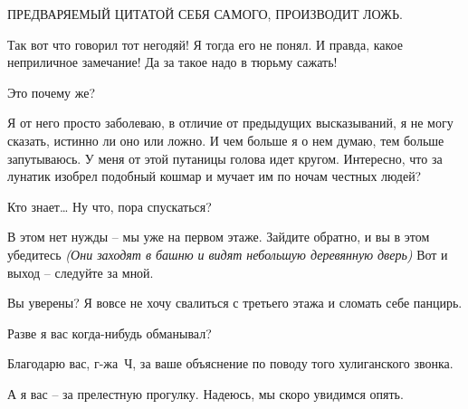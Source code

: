 \documentclass[../main.tex]{subfiles}
\begin{document}
\begin{Dialogue}
ПРЕДВАРЯЕМЫЙ ЦИТАТОЙ СЕБЯ САМОГО, ПРОИЗВОДИТ ЛОЖЬ.

Так вот что говорил тот негодяй! Я тогда его не понял. И правда, какое неприличное замечание! Да за такое надо в тюрьму сажать!

 Это почему же?

 Я от него просто заболеваю, в отличие от предыдущих высказываний, я не могу сказать, истинно ли оно или ложно. И чем больше я о нем думаю, тем больше запутываюсь. У меня от этой путаницы голова идет кругом. Интересно, что за лунатик изобрел подобный кошмар и мучает им по ночам честных людей?

 Кто знает\ldots{} Ну что, пора спускаться?

 В этом нет нужды \--- мы уже на первом этаже. Зайдите обратно, и вы в этом убедитесь \emph{(Они заходят в башню и видят небольшую деревянную дверь)} Вот и выход \--- следуйте за мной.

 Вы уверены? Я вовсе не хочу свалиться с третьего этажа и сломать себе панцирь.

 Разве я вас когда-нибудь обманывал?


Благодарю вас, г-жа~Ч, за ваше объяснение по поводу того хулиганского звонка.

 А я вас \--- за прелестную прогулку. Надеюсь, мы скоро увидимся опять.

\end{Dialogue}
\end{document}
